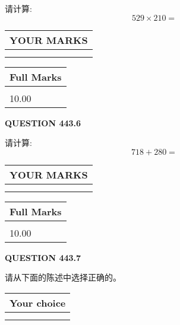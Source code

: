 \documentclass{ctexart}
\begin{document}
  
 
请计算:
\begin{equation}
529  \times    %
210 = \nonumber
\end{equation}
 

 

 
  
\vspace{0.2in}
  
\noindent\begin{tabular}{|l|}
\hline
 YOUR MARKS  \\
\hline
 \\ 
 \\ 
\hline
\end{tabular}
\hspace{0.05in} \begin{tabular}{|l|}
\hline
 Full Marks  \\
\hline
 \\ 
10.00 \\
\hline
\end{tabular}
{\textbf{\Large{QUESTION
443.6 
}}}
  
  
 
请计算:
\begin{equation}
718 +  %
280 = \nonumber
\end{equation}
 

 

 
  
\vspace{0.2in}
  
\noindent\begin{tabular}{|l|}
\hline
 YOUR MARKS  \\
\hline
 \\ 
 \\ 
\hline
\end{tabular}
\hspace{0.05in} \begin{tabular}{|l|}
\hline
 Full Marks  \\
\hline
 \\ 
10.00 \\
\hline
\end{tabular}
{\textbf{\Large{QUESTION
443.7 
}}}
  
  
请从下面的陈述中选择正确的。
  
  
\noindent\hspace{3.0in} \begin{tabular}{|l|}
\hline
Your choice \\
\hline
 \\ 
 \\ 
\hline
\end{tabular}
  
\end{document}
